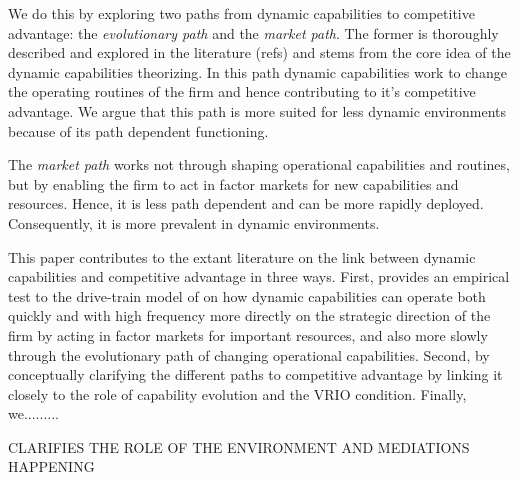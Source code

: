 \documentclass[review,fleqn]{elsarticle}\usepackage[]{graphicx}\usepackage[]{color}
\begin{document}
We do this by exploring two paths from dynamic capabilities to competitive advantage: the
\emph{evolutionary path} and the \emph{market path}. The former is thoroughly described
and explored in the literature (refs) and stems from the core idea of the dynamic
capabilities theorizing. In this path dynamic capabilities work to change the operating
routines of the firm and hence contributing to it's competitive advantage. We argue that
this path is more suited for less dynamic environments because of its path dependent
functioning.

The \emph{market path} works not through shaping operational capabilities and routines,
but by enabling the firm to act in factor markets for new capabilities and
resources. Hence, it is less path dependent and can be more rapidly
deployed. Consequently, it is more prevalent in dynamic environments.

This paper contributes to the extant literature on the link between dynamic capabilities
and competitive advantage in three ways. First, provides an empirical test to the
drive-train model of \cite{DiStefano2014} on how dynamic capabilities can operate both
quickly and with high frequency more directly on the strategic direction of the firm by
acting in factor markets for important resources, and also more slowly through the
evolutionary path of changing operational capabilities. Second, by conceptually clarifying
the different paths to competitive advantage by linking it closely to the role of
capability evolution and the VRIO condition. Finally, we.........

CLARIFIES THE ROLE OF THE ENVIRONMENT AND MEDIATIONS HAPPENING



\end{document}
